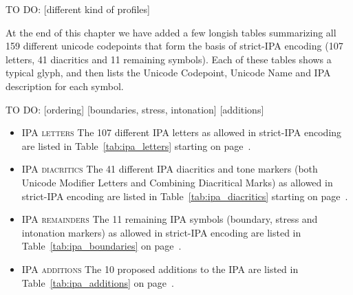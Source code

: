 TO DO: 
[different kind of profiles]

At the end of this chapter we have added a few longish tables summarizing all
159 different unicode codepoints that form the basis of strict-IPA encoding
(107 letters, 41 diacritics and 11 remaining symbols). Each of
these tables shows a typical glyph, and then lists the Unicode Codepoint,
Unicode Name and IPA description for each symbol.

TO DO:
[ordering]
[boundaries, stress, intonation]
[additions]


\begin{itemize}[itemsep=6pt]

   \item \textsc{IPA letters} \newline
        The 107 different IPA letters as allowed in strict-IPA encoding are
        listed in Table~\ref{tab:ipa_letters} starting on
        page~\pageref{tab:ipa_letters}.
  \item \textsc{IPA diacritics} \newline The 41 different IPA diacritics and
        tone markers (both Unicode Modifier Letters and Combining Diacritical
        Marks) as allowed in strict-IPA encoding are listed in
        Table~\ref{tab:ipa_diacritics} starting on
        page~\pageref{tab:ipa_diacritics}.
  \item \textsc{IPA remainders} \newline The 11 remaining IPA symbols
        (boundary, stress and intonation markers) as allowed in strict-IPA
        encoding are listed in Table~\ref{tab:ipa_boundaries} on
        page~\pageref{tab:ipa_boundaries}. 
  \item \textsc{IPA additions} \newline
        The 10 proposed additions to the IPA are listed in
        Table~\ref{tab:ipa_additions} on page~\pageref{tab:ipa_additions}.
  
\end{itemize}


\newpage

 



